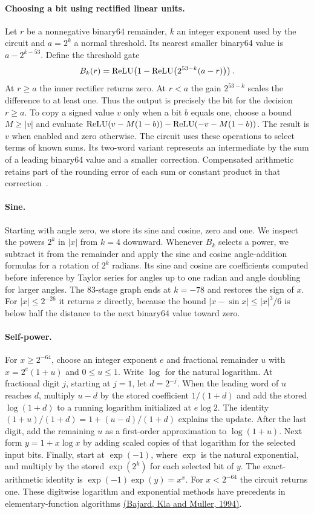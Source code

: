\paragraph{Choosing a bit using rectified linear units.}
Let $r$ be a nonnegative binary64 remainder, $k$ an integer exponent used by the circuit and $a=2^k$ a normal threshold. Its nearest smaller binary64 value is $a-2^{k-53}$. Define the threshold gate
\[
 B_k(r)=\operatorname{ReLU}\!\left(1-\operatorname{ReLU}\!\left(2^{53-k}(a-r)\right)\right).
\]
At $r\ge a$ the inner rectifier returns zero. At $r<a$ the gain $2^{53-k}$ scales the difference to at least one. Thus the output is precisely the bit for the decision $r\ge a$. To copy a signed value $v$ only when a bit $b$ equals one, choose a bound $M\ge |v|$ and evaluate $\operatorname{ReLU}(v-M(1-b))-\operatorname{ReLU}(-v-M(1-b))$. The result is $v$ when enabled and zero otherwise. The circuit uses these operations to select terms of known sums. Its two-word variant represents an intermediate by the sum of a leading binary64 value and a smaller correction. Compensated arithmetic retains part of the rounding error of each sum or constant product in that correction~\cite{dekker1971}.

\paragraph{Sine.}
Starting with angle zero, we store its sine and cosine, zero and one. We inspect the powers $2^k$ in $|x|$ from $k=4$ downward. Whenever $B_k$ selects a power, we subtract it from the remainder and apply the sine and cosine angle-addition formulas for a rotation of $2^k$ radians. Its sine and cosine are coefficients computed before inference by Taylor series for angles up to one radian and angle doubling for larger angles. The 83-stage graph ends at $k=-78$ and restores the sign of $x$. For $|x|\le 2^{-26}$ it returns $x$ directly, because the bound $|x-\sin x|\le |x|^3/6$ is below half the distance to the next binary64 value toward zero.

\paragraph{Self-power.}
For $x\ge 2^{-64}$, choose an integer exponent $e$ and fractional remainder $u$ with $x=2^e(1+u)$ and $0\le u\le 1$. Write $\log$ for the natural logarithm. At fractional digit $j$, starting at $j=1$, let $d=2^{-j}$. When the leading word of $u$ reaches $d$, multiply $u-d$ by the stored coefficient $1/(1+d)$ and add the stored $\log(1+d)$ to a running logarithm initialized at $e\log 2$. The identity $(1+u)/(1+d)=1+(u-d)/(1+d)$ explains the update. After the last digit, add the remaining $u$ as a first-order approximation to $\log(1+u)$. Next form $y=1+x\log x$ by adding scaled copies of that logarithm for the selected input bits. Finally, start at $\exp(-1)$, where $\exp$ is the natural exponential, and multiply by the stored $\exp(2^k)$ for each selected bit of $y$. The exact-arithmetic identity is $\exp(-1)\exp(y)=x^x$. For $x<2^{-64}$ the circuit returns one. These digitwise logarithm and exponential methods have precedents in elementary-function algorithms \href{https://doi.org/10.1109/12.295857}{(Bajard, Kla and Muller, 1994)}.

